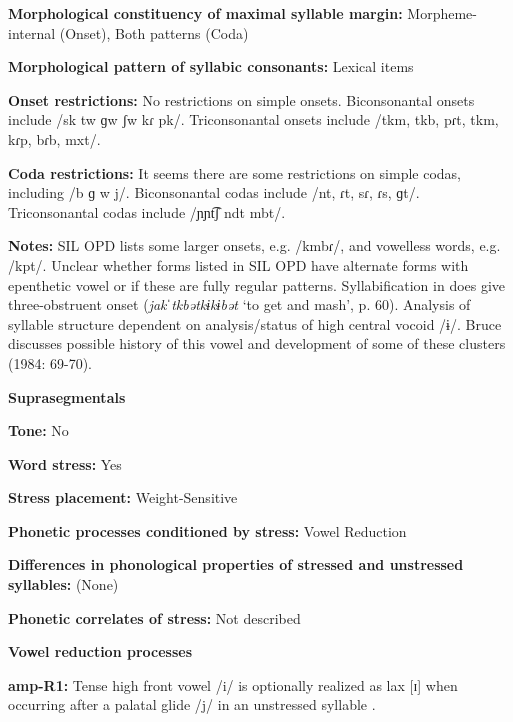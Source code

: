 \textbf{Morphological constituency of maximal syllable margin:} Morpheme-internal (Onset), Both patterns (Coda)



\textbf{Morphological pattern of syllabic consonants:} Lexical items



\textbf{Onset restrictions:} No restrictions on simple onsets. Biconsonantal onsets include /sk tw ɡw ʃw kɾ pk/. Triconsonantal onsets include /tkm, tkb, pɾt, tkm, kɾp, bɾb, mxt/.



\textbf{Coda restrictions:} It seems there are some restrictions on simple codas, including /b ɡ w j/. Biconsonantal codas include /nt, ɾt, sɾ, ɾs, ɡt/. Triconsonantal codas include /ɲɲt͡ʃ ndt mbt/.



\textbf{Notes:} SIL OPD lists some larger onsets, e.g. /kmbɾ/, and vowelless words, e.g. /kpt/. Unclear whether forms listed in SIL OPD have alternate forms with epenthetic vowel or if these are fully regular patterns. Syllabification in \citet{Bruce1984} does give three-obstruent onset (\textit{jakˈtkbətkɨkɨbət} ‘to get and mash’, p. 60). Analysis of syllable structure dependent on analysis/status of high central vocoid /ɨ/. Bruce discusses possible history of this vowel and development of some of these clusters (1984: 69-70).



\textbf{Suprasegmentals}



\textbf{Tone:} No



\textbf{Word stress:} Yes



\textbf{Stress placement:} Weight-Sensitive



\textbf{Phonetic processes conditioned by stress:} Vowel Reduction



\textbf{Differences in phonological properties of stressed and unstressed syllables:} (None)



\textbf{Phonetic correlates of stress:} Not described



\textbf{Vowel reduction processes}



\textbf{amp-R1:} Tense high front vowel /i/ is optionally realized as lax [ɪ] when occurring after a palatal glide /j/ in an unstressed syllable \citep[37]{Bruce1984}.



